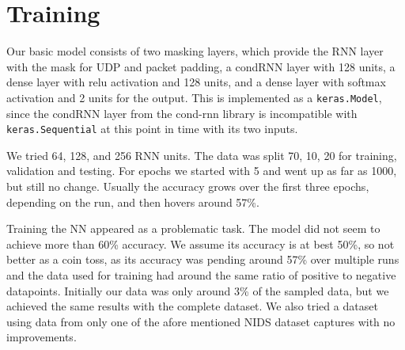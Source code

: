 \documentclass[
	ngerman,
	ruledheaders=section,%
	class=report,%
	thesis={type=bachelor},%
	accentcolor=9c,%
	custommargins=true,%
	marginpar=false,%
	parskip=half-,%
	fontsize=11pt,%
]{tudapub}
\begin{document}



\section{Training}

Our basic model consists of two masking layers, which provide the RNN layer with the mask for UDP and packet padding,
a condRNN layer with 128 units,
a dense layer with relu activation and 128 units,
and a dense layer with softmax activation and 2 units for the output.
This is implemented as a \lstinline{keras.Model}, since the condRNN layer from the cond-rnn library is incompatible with \lstinline{keras.Sequential} at this point in time with its two inputs.

We tried 64, 128, and 256 RNN units.
The data was split 70, 10, 20 for training, validation and testing.
For epochs we started with 5 and went up as far as 1000, but still no change.
Usually the accuracy grows over the first three epochs, depending on the run, and then hovers around 57\%.

Training the NN appeared as a problematic task.
The model did not seem to achieve more than 60\% accuracy.
We assume its accuracy is at best 50\%, so not better as a coin toss,
as its accuracy was pending around 57\% over multiple runs and the data used for training had around the same ratio of positive to negative datapoints.
Initially our data was only around 3\% of the sampled data, but we achieved the same results with the complete dataset.
We also tried a dataset using data from only one of the afore mentioned NIDS dataset captures with no improvements.
\end{document}
